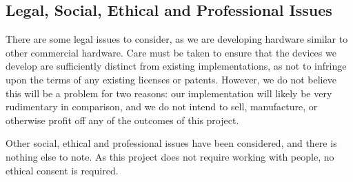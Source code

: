 \documentclass[a4paper,fleqn,12pt]{article}
\begin{document}
\subsection{Legal, Social, Ethical and Professional Issues}

There are some legal issues to consider, as we are developing hardware similar to other commercial hardware. Care must be taken to ensure that the devices we develop are sufficiently distinct from existing implementations, as not to infringe upon the terms of any existing licenses or patents. However, we do not believe this will be a problem for two reasons: our implementation will likely be very rudimentary in comparison, and we do not intend to sell, manufacture, or otherwise profit off any of the outcomes of this project.

Other social, ethical and professional issues have been considered, and there is nothing else to note. As this project does not require working with people, no ethical consent is required.
\end{document}
